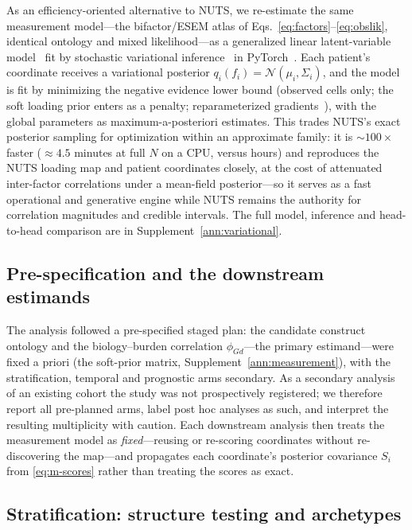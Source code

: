 As an efficiency-oriented alternative to NUTS, we re-estimate the same measurement
model---the bifactor/ESEM atlas of Eqs.~\eqref{eq:factors}--\eqref{eq:obslik}, identical
ontology and mixed likelihood---as a generalized linear latent-variable
model~\citep{hui2017gllvm} fit by stochastic variational
inference~\citep{blei2017vi,hoffman2013svi} in PyTorch~\citep{paszke2019pytorch}. Each
patient's coordinate receives a variational posterior $q_i(f_i)=\mathcal N(\mu_i,\Sigma_i)$,
and the model is fit by minimizing the negative evidence lower bound (observed cells only; the
soft loading prior enters as a penalty; reparameterized gradients~\citep{kingma2014vae}), with
the global parameters as maximum-a-posteriori estimates. This trades NUTS's exact posterior
sampling for optimization within an approximate family: it is ${\sim}100\times$ faster
(${\approx}4.5$ minutes at full $N$ on a CPU, versus hours) and reproduces the NUTS loading map
and patient coordinates closely, at the cost of attenuated inter-factor correlations under a
mean-field posterior---so it serves as a fast operational and generative engine while NUTS
remains the authority for correlation magnitudes and credible intervals. The full model,
inference and head-to-head comparison are in Supplement~\ref{ann:variational}.

\subsection{Pre-specification and the downstream estimands}

The analysis followed a pre-specified staged plan: the candidate construct ontology and the
biology--burden correlation $\phi_{Gd}$---the primary estimand---were fixed a priori (the
soft-prior matrix, Supplement~\ref{ann:measurement}), with the stratification, temporal and
prognostic arms secondary. As a
secondary analysis of an existing cohort the study was not prospectively registered; we
therefore report all pre-planned arms, label post hoc analyses as such, and interpret the
resulting multiplicity with caution. Each downstream analysis then treats the measurement
model as \emph{fixed}---reusing or re-scoring coordinates without re-discovering the
map---and propagates each coordinate's posterior covariance $S_i$ from \eqref{eq:m-scores}
rather than treating the scores as exact.

\subsection{Stratification: structure testing and archetypes}

